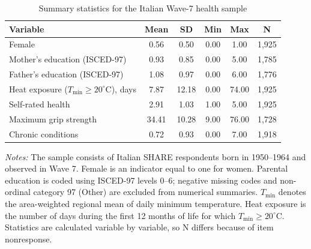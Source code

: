 \begin{table}[!htbp]
\centering
\caption{Summary statistics for the Italian Wave-7 health sample}
\label{tab:italy-health-summary-statistics}
\begin{tabular}{lccccc}
\toprule
Variable & Mean & SD & Min & Max & N \\
\midrule
Female & 0.56 & 0.50 & 0.00 & 1.00 & 1,925 \\
Mother's education (ISCED-97) & 0.93 & 0.85 & 0.00 & 5.00 & 1,785 \\
Father's education (ISCED-97) & 1.08 & 0.97 & 0.00 & 6.00 & 1,776 \\
Heat exposure ($T_{\min} \geq 20^{\circ}$C), days & 7.87 & 12.18 & 0.00 & 74.00 & 1,925 \\
Self-rated health & 2.91 & 1.03 & 1.00 & 5.00 & 1,925 \\
Maximum grip strength & 34.41 & 10.28 & 9.00 & 76.00 & 1,728 \\
Chronic conditions & 0.72 & 0.93 & 0.00 & 7.00 & 1,918 \\
\bottomrule
\end{tabular}
\begin{minipage}{0.92\textwidth}\footnotesize
\textit{Notes:} The sample consists of Italian SHARE respondents born in 1950--1964 and observed in Wave 7. Female is an indicator equal to one for women. Parental education is coded using ISCED-97 levels 0--6; negative missing codes and non-ordinal category 97 (Other) are excluded from numerical summaries. $T_{\min}$ denotes the area-weighted regional mean of daily minimum temperature. Heat exposure is the number of days during the first 12 months of life for which $T_{\min} \geq 20^{\circ}$C. Statistics are calculated variable by variable, so N differs because of item nonresponse.
\end{minipage}
\end{table}
